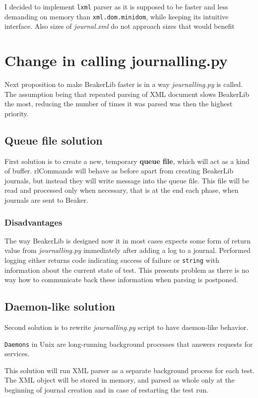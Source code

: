 I decided to implement \texttt{lxml} parser as it is supposed to be faster and less demanding on memory than \texttt{xml.dom.minidom}\cite{lxml_performance}, while keeping its intuitive interface. Also sizes of \textit{journal.xml} do not approach sizes that would benefit

\section{Change in calling journalling.py}
Next proposition to make BeakerLib faster is in a way \textit{journalling.py} is called. The assumption being that repeated parsing of XML document slows BeakerLib the most, reducing the number of times it was parsed was then the highest priority. 

\subsection{Queue file solution} 
First solution is to create a new, temporary \textbf{queue file}, which will act as a kind of buffer. \mbox{rlCommands} will behave as before apart from creating BeakerLib journals, but instead they will write message into the queue file. This file will be read and processed only when necessary, that is at the end each phase, when journals are sent to Beaker.

\subsubsection{Disadvantages}
The way BeakerLib is designed now it in most cases expects some form of return value from \textit{journalling.py} immediately after adding a log to a journal. Performed logging either returns code indicating success of failure or \texttt{string} with information about the current state of test. This presents problem as there is no way how to communicate back these information when parsing is postponed. 

\subsection{Daemon-like solution}
Second solution is to rewrite \textit{journalling.py} script to have daemon-like behavior. 

\texttt{Daemons} in Unix are long-running background processes that answers requests for services\cite{daemon_explanation}.

This solution will run XML parser as a separate background process for each test. The XML object will be stored in memory, and parsed as whole only at the beginning of journal creation and in case of restarting the test run.  

